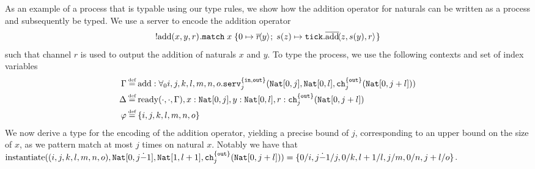 \begin{example}\label{example:addition}
As an example of a process that is typable using our type rules, we show how the addition operator for naturals can be written as a process and subsequently be typed. We use a server to encode the addition operator
\begin{align*}
    !\text{add}(x,y,r)^{}.\texttt{match}\; x\; \{ 0 \mapsto \overline{r}\!\langle y\rangle^{};\; s(z) \mapsto \texttt{tick}.\overline{\text{add}}\!\langle z,s(y),r\rangle^{} \}
\end{align*}
such that channel $r$ is used to output the addition of naturals $x$ and $y$. To type the process, we use the following contexts and set of index variables
\begin{align*}
    \Gamma\defeq&\; \text{add} : \forall_0 i,j,k,l,m,n,o.\texttt{serv}^{\{\texttt{in},\texttt{out}\}}_j(\texttt{Nat}[0,j],\texttt{Nat}[0,l],\texttt{ch}^{\{\texttt{out}\}}_j(\texttt{Nat}[0,j+l])) \\
    \Delta\defeq&\; \text{ready}(\cdot,\cdot,\Gamma), x : \texttt{Nat}[0,j], y: \texttt{Nat}[0,l], r:\texttt{ch}^{\{\texttt{out}\}}_j(\texttt{Nat}[0,j+l])\\
    \varphi \defeq&\; \{i,j,k,l,m,n,o\}
\end{align*}
%
We now derive a type for the encoding of the addition operator, yielding a precise bound of $j$, corresponding to an upper bound on the size of $x$, as we pattern match at most $j$ times on natural $x$. Notably we have that $\text{instantiate}((i,j,k,l,m,n,o),\texttt{Nat}[0,j\dot - 1],\texttt{Nat}[1,l+1],\texttt{ch}^{\{\texttt{out}\}}_j(\texttt{Nat}[0,j+l]))=\{0/i,j\dot - 1/j,0/k,l+1/l,j/m,0/n,j+l/o\}$.
%

\end{example}
